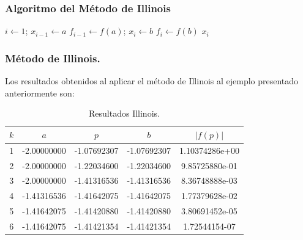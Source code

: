 \documentclass{beamer}
\begin{document}
\begin{frame}
  \frametitle{Algoritmo del M\'etodo de Illinois}
  \small{ 
  \begin{algorithm}[H]
    \SetAlgoLined
    $i \leftarrow 1$; $x_{i-1} \leftarrow a$\;
    $f_{i-1} \leftarrow f(a)$; $x_{i} \leftarrow b$\;
    $f_{i} \leftarrow f(b)$\;
    \KwRet $x_i$
  \end{algorithm}}
\end{frame}
\begin{frame}
  \frametitle{M\'etodo de Illinois.}
  Los resultados obtenidos al aplicar el m\'etodo de Illinois al ejemplo presentado anteriormente son:    \begin{center}
  \begin{table}[!ht]
    \begin{center}
    \begin{tabular}{|c||c||c||c||c|}\hline
  $k$  & $a$ & $p$ & $b$ & $|f(p)|$ \\\hline\hline
  1 & -2.00000000 & -1.07692307 & -1.07692307 & 1.10374286e+00\\\hline
  2 & -2.00000000 & -1.22034600 & -1.22034600 & 9.85725880e-01\\\hline
  3 & -2.00000000 & -1.41316536 & -1.41316536 & 8.36748888e-03\\\hline
  4 & -1.41316536 & -1.41642075 & -1.41642075 & 1.77379628e-02\\\hline
  5 & -1.41642075 & -1.41420880 & -1.41420880 & 3.80691452e-05\\\hline
  6 & -1.41642075 & -1.41421354 & -1.41421354 & 1.72544154-07\\\hline
 \end{tabular}
 \caption{Resultados Illinois.}\end{center}
 \label{tab_illinois}
\end{table}
  \end{center}
\end{frame}
\end{document}
